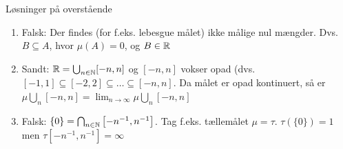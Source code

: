 \begin{solution}
Løsninger på overstående
\begin{enumerate}
  \item  Falsk: Der findes (for f.eks. lebesgue målet) ikke målige nul mængder. Dvs. \(B\subseteq A\), hvor \(\mu(A)=0\), og \(B\in{\mathbb{R}}\)
\item Sandt: \({\mathbb{R}}=\bigcup_{n\in{\mathbb{N}}}[-n,n]\) og \(\left[-n,n\right]\) vokser opad (dvs. \([-1,1]\subseteq[-2,2]\subseteq\ldots\subseteq [-n,n]\). Da målet er opad kontinuert, så er \(\mu\bigcup_n[-n,n]=\lim_{n \rightarrow \infty}\mu\bigcup_n[-n,n]\)
\item Falsk: \(\{0\}=\bigcap_{n\in{\mathbb{N}}}\left[-n^{-1},n^{-1}\right]\). Tag f.eks. tællemålet \(\mu=\tau\). \(\tau(\{0\})=1\) men \(\tau\left[-n^{-1},n^{-1}\right]=\infty\)
\end{enumerate}
\end{solution}
